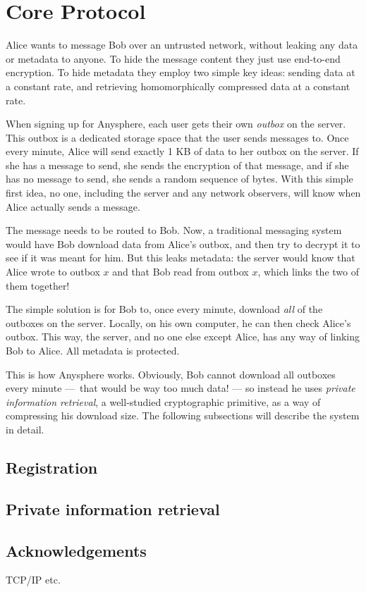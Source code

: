 \section{Core Protocol}

Alice wants to message Bob over an untrusted network, without leaking any data or metadata to anyone. To hide the message content they just use end-to-end encryption. To hide metadata they employ two simple key ideas: sending data at a constant rate, and retrieving homomorphically compressed data at a constant rate.

When signing up for Anysphere, each user gets their own \textit{outbox} on the server. This outbox is a dedicated storage space that the user sends messages to. Once every minute, Alice will send exactly 1 KB of data to her outbox on the server. If she has a message to send, she sends the encryption of that message, and if she has no message to send, she sends a random sequence of bytes. With this simple first idea, no one, including the server and any network observers, will know when Alice actually sends a message.

The message needs to be routed to Bob. Now, a traditional messaging system would have Bob download data from Alice's outbox, and then try to decrypt it to see if it was meant for him. But this leaks metadata: the server would know that Alice wrote to outbox $x$ and that Bob read from outbox $x$, which links the two of them together!

The simple solution is for Bob to, once every minute, download \textit{all} of the outboxes on the server. Locally, on his own computer, he can then check Alice's outbox. This way, the server, and no one else except Alice, has any way of linking Bob to Alice. All metadata is protected.

This is how Anysphere works. Obviously, Bob cannot download all outboxes every minute — that would be way too much data! — so instead he uses \textit{private information retrieval}, a well-studied cryptographic primitive, as a way of compressing his download size. The following subsections will describe the system in detail.

\subsection{Registration}

\subsection{Private information retrieval}

\subsection{Acknowledgements}

TCP/IP etc.